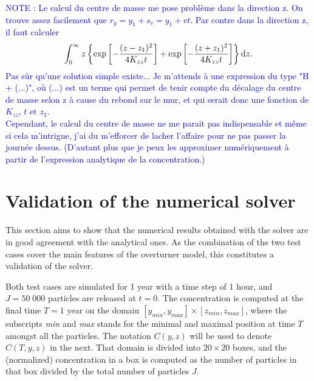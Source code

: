 \textcolor{blue}{NOTE : Le calcul du centre de masse me pose problème dans la direction z. On trouve assez facilement que $r_y = y_1 + s_v = y_1 + vt$. Par contre dans la direction z, il faut calculer $$\int_{0}^{\infty} z \left\{\exp\left[-\frac{(z-z_1)^2}{4K_{zz}t} \right] + \exp\left[-\frac{(z+z_1)^2}{4K_{zz}t} \right] \right\}\rm dz.$$ Pas sûr qu'une solution simple existe... Je m'attends à une expression du type "H + (...)", où (...) est un terme qui permet de tenir compte du décalage du centre de masse selon z à cause du rebond sur le mur, et qui serait donc une fonction de $K_{zz}$, $t$ et $z_1$.\\
Cependant, le calcul du centre de masse ne me parait pas indispensable et même si cela m'intrigue, j'ai du m'efforcer de lacher l'affaire pour ne pas passer la journée dessus. (D'autant plus que je peux les approximer numériquement à partir de l'expression analytique de la concentration.)}

\section{Validation of the numerical solver}
This section aims to show that the numerical results obtained with the solver are in good agreement with the analytical ones. As the combination of the two test cases cover the main features of the overturner model, this constitutes a validation of the solver. 

Both test cases are simulated for 1 year with a time step of 1 hour, and $J = 50\;000$ particles are released at $t=0$.
The concentration is computed at the final time $T = 1$ year on the domain $[y_{min},y_{max}] \times [z_{min},z_{max}]$, where the subscripts \textit{min} and \textit{max} stands for the minimal and maximal position at time $T$ amongst all the particles. The notation $C(y,z)$ will be used to denote $C(T,y,z)$ in the next. That domain is divided into $20 \times 20$ boxes, and the (normalized) concentration in a box is computed as the number of particles in that box divided by the total number of particles $J$.

